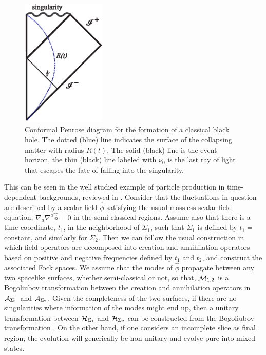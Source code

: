 \documentclass[12pt]{article}
\begin{document}
\begin{figure}[th]
\centering \includegraphics[width=4cm]{evap1}

\caption{Conformal Penrose diagram for the formation of a classical black hole.  The dotted (blue) line indicates
the surface of the collapsing matter with radius $R(t)$. The solid (black) line is the event horizon, the thin (black) line
labeled with $\nu_0$ is the last ray of light that escapes the fate of falling into
the singularity. \label{class}}
\end{figure}



This can be seen in the well studied example of particle production in time-dependent backgrounds, reviewed in \cite{BD,Ford:1997hb}.  
Consider that the fluctuations in question are described by a scalar field
$\hat{\phi} $ satisfying the usual massless scalar field equation, $\nabla_a \nabla^a \hat{\phi}=0$ in the semi-classical regions.  Assume also that  there is a time coordinate, $t_1$,  in the neighborhood of $\Sigma_1$, such that $\Sigma_1$ is defined by $t_1=$ constant,  and similarly 
for $\Sigma_2$.  Then we can follow the usual construction in which field
operators are decomposed into creation and annihilation operators based on positive and negative frequencies defined by $t_1$
and $t_2$, and construct the associated Fock spaces. We assume that the modes of $\hat{\phi} $ propagate between any two spacelike surfaces, whether 
semi-classical or not, so that,  ${\cal M}_{1,2}$ is a Bogoliubov transformation between
the creation and annihilation operators in ${\cal A}_{\Sigma_1}$ and ${\cal A}_{\Sigma_2}$. Given the completeness 
of the two surfaces, if there are no singularities where information of the modes might end up, then 
a unitary transformation
between ${\cal H}_{\Sigma_1}$ and ${\cal H}_{\Sigma_2}$ can be constructed from the Bogoliubov transformation \cite{DeWitt}. 
On the other hand, if  one
considers an incomplete slice as final region, the evolution will generically be non-unitary and evolve pure into mixed states.
\end{document}
